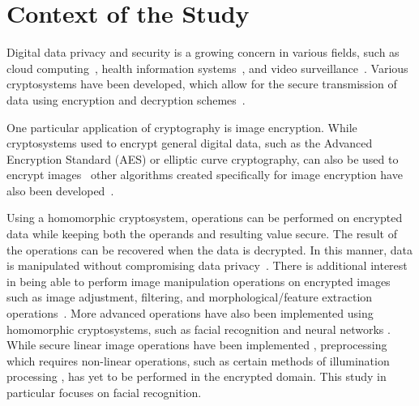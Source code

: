 
\section{Context of the Study}

Digital data privacy and security is a growing concern in various fields, such as cloud computing~\cite{potey_homomorphic_2016}, health information systems~\cite{kester_cryptographic_2015}, and video surveillance~\cite{upmanyu_efficient_2009}. Various cryptosystems have been developed, which allow for the secure transmission of data using encryption and decryption schemes~\cite{bauer_cryptosystem_2005}.

One particular application of cryptography is image encryption. While cryptosystems used to encrypt general digital data, such as the Advanced Encryption Standard (AES) or elliptic curve cryptography, can also be used to encrypt images~\cite{jain_image_2016, singh_image_2015} other algorithms created specifically for image encryption have also been developed~\cite{murugan_survey_2018}.

 Using a homomorphic cryptosystem, operations can be performed on encrypted data while keeping both the operands and resulting value secure. The result of the operations can be recovered when the data is decrypted. In this manner, data is manipulated without compromising data privacy~\cite{fontaine_survey_2007, sen_homomorphic_2013}. There is additional interest in being able to perform image manipulation operations on encrypted images such as image adjustment, filtering, and morphological/feature extraction operations~\cite{ziad_cryptoimg:_2016, gonzalez_digital_2008}. More advanced operations have also been implemented using homomorphic cryptosystems, such as facial recognition \cite{hutchison_privacy-preserving_2009} and neural networks \cite{hesamifard_cryptodl:_2017}. While secure linear image operations have been implemented \cite{ziad_cryptoimg:_2016}, preprocessing which requires non-linear operations, such as certain methods of illumination processing \cite{oravec_illumination_2010}, has yet to be performed in the encrypted domain. This study in particular focuses on facial recognition. 
